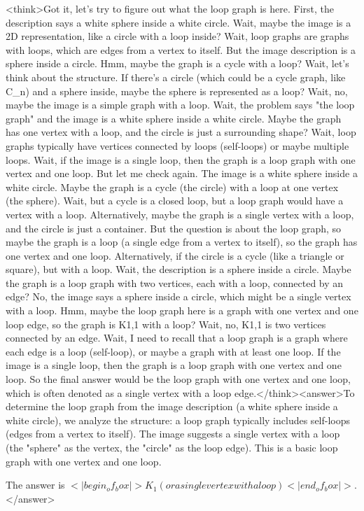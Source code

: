 <think>Got it, let's try to figure out what the loop graph is here. First, the description says a white sphere inside a white circle. Wait, maybe the image is a 2D representation, like a circle with a loop inside? Wait, loop graphs are graphs with loops, which are edges from a vertex to itself. But the image description is a sphere inside a circle. Hmm, maybe the graph is a cycle with a loop? Wait, let's think about the structure. If there's a circle (which could be a cycle graph, like C_n) and a sphere inside, maybe the sphere is represented as a loop? Wait, no, maybe the image is a simple graph with a loop. Wait, the problem says "the loop graph" and the image is a white sphere inside a white circle. Maybe the graph has one vertex with a loop, and the circle is just a surrounding shape? Wait, loop graphs typically have vertices connected by loops (self-loops) or maybe multiple loops. Wait, if the image is a single loop, then the graph is a loop graph with one vertex and one loop. But let me check again. The image is a white sphere inside a white circle. Maybe the graph is a cycle (the circle) with a loop at one vertex (the sphere). Wait, but a cycle is a closed loop, but a loop graph would have a vertex with a loop. Alternatively, maybe the graph is a single vertex with a loop, and the circle is just a container. But the question is about the loop graph, so maybe the graph is a loop (a single edge from a vertex to itself), so the graph has one vertex and one loop. Alternatively, if the circle is a cycle (like a triangle or square), but with a loop. Wait, the description is a sphere inside a circle. Maybe the graph is a loop graph with two vertices, each with a loop, connected by an edge? No, the image says a sphere inside a circle, which might be a single vertex with a loop. Hmm, maybe the loop graph here is a graph with one vertex and one loop edge, so the graph is K1,1 with a loop? Wait, no, K1,1 is two vertices connected by an edge. Wait, I need to recall that a loop graph is a graph where each edge is a loop (self-loop), or maybe a graph with at least one loop. If the image is a single loop, then the graph is a loop graph with one vertex and one loop. So the final answer would be the loop graph with one vertex and one loop, which is often denoted as a single vertex with a loop edge.</think><answer>To determine the loop graph from the image description (a white sphere inside a white circle), we analyze the structure: a loop graph typically includes self-loops (edges from a vertex to itself). The image suggests a single vertex with a loop (the "sphere" as the vertex, the "circle" as the loop edge). This is a basic loop graph with one vertex and one loop.  

The answer is \(<|begin_of_box|>K_1 (or a single vertex with a loop)<|end_of_box|>\).</answer>